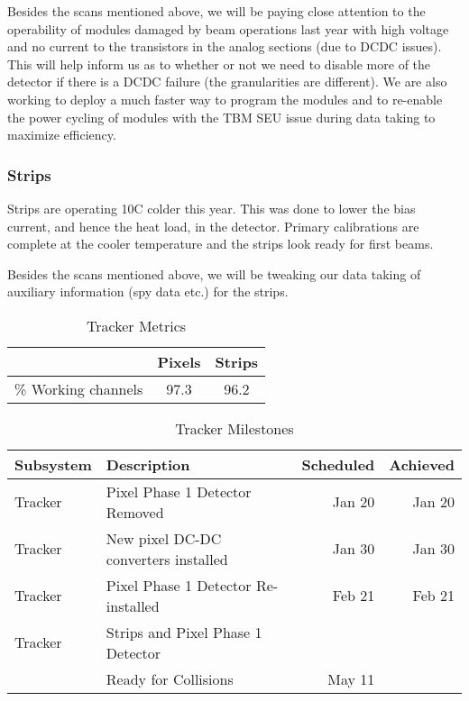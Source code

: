 \documentclass[12pt]{article}
\begin{document}
Besides the scans mentioned above, we will be paying close attention to 
the operability of modules damaged by beam operations last year with high voltage and no current to the transistors in the analog sections (due to DCDC issues). This will help inform us as to whether or not we need to disable more of the detector if there is a DCDC failure (the granularities are different). We are also working to deploy a much faster way to program the modules and to re-enable the power cycling of modules with the TBM SEU issue during data taking to maximize efficiency. 

\subsubsection{Strips}

Strips are operating 10C colder this year. This was done to lower the bias current, and hence the heat load, in the detector. Primary calibrations are complete at the cooler temperature and the strips look ready for first beams.

Besides the scans mentioned above, we will be tweaking our data taking of auxiliary information (spy data etc.) for the strips.

\begin{table}[htp]
\caption{Tracker Metrics}
\begin{center}
\begin{tabular}{|l|c|c|}
\hline
 &Pixels&Strips\\
\hline
\% Working channels & 97.3 &  96.2 \\
\hline
\end{tabular}
\end{center}
\label{TrackerMetrics}
\end{table}%


\begin{table}[htp]
\caption{Tracker Milestones}
\begin{center}
\begin{tabular}{|l|l|r|r|}
\hline
Subsystem&Description&Scheduled&Achieved\\
\hline
Tracker & Pixel Phase 1 Detector Removed&Jan 20&Jan 20 \\
\hline
Tracker & New pixel DC-DC converters installed &Jan 30 &Jan 30 \\
\hline
Tracker & Pixel Phase 1 Detector Re-installed &Feb 21 &Feb 21 \\
\hline
Tracker & Strips and Pixel Phase 1 Detector & & \\ 
        & Ready for Collisions  &May 11 & \\
\hline
\end{tabular}
\end{center}
\label{TrackerMilestones}
\end{table}%
\end{document}
